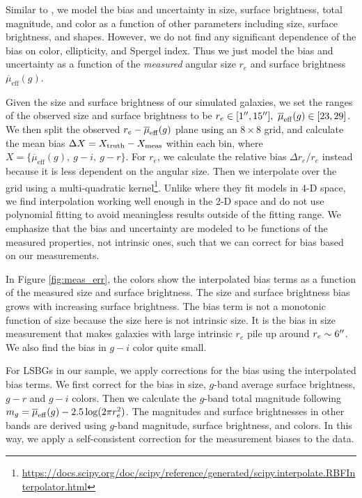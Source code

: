 \documentclass[twocolumn,astrosymb,twocolappendix]{aastex631}
\newcommand{\sbeff}{\overline{\mu}_{\mathrm{eff}}(g)}
\begin{document}
\begin{CJK*}{UTF8}{gbsn}
Similar to \citet{Zaritsky2021}, we model the bias and uncertainty in size, surface brightness, total magnitude, and color as a function of other parameters including size, surface brightness, and shapes. However, we do not find any significant dependence of the bias on color, ellipticity, and Spergel index. Thus we just model the bias and uncertainty as a function of the \textit{measured} angular size $r_e$ and surface brightness $\sbeff$.

Given the size and surface brightness of our simulated galaxies, we set the ranges of the observed size and surface brightness to be $r_e\in[1\arcsec, 15\arcsec],\ \sbeff\in[23, 29]$. We then split the observed $r_e-\overline{\mu}_{\rm eff}(g)$ plane using an $8\times 8$ grid, and calculate the mean bias $\Delta X = X_{\rm truth} - X_{\rm meas}$ within each bin, where $X=\{\sbeff,\ g-i,\ g-r\}$. For $r_e$, we calculate the relative bias $\Delta r_e / r_e$ instead because it is less dependent on the angular size. Then we interpolate over the grid using a multi-quadratic kernel\footnote{\url{https://docs.scipy.org/doc/scipy/reference/generated/scipy.interpolate.RBFInterpolator.html}}. Unlike \citet{Zaritsky2021} where they fit models in 4-D space, we find interpolation working well enough in the 2-D space and do not use polynomial fitting to avoid meaningless results outside of the fitting range. We emphasize that the bias and uncertainty are modeled to be functions of the measured properties, not intrinsic ones, such that we can correct for bias based on our measurements. 

In Figure \ref{fig:meas_err}, the colors show the interpolated bias terms as a function of the measured size and surface brightness. The size and surface brightness bias grows with increasing surface brightness. The bias term is not a monotonic function of size because the size here is not intrinsic size. It is the bias in size measurement that makes galaxies with large intrinsic $r_e$ pile up around $r_e\sim 6\mbox{$^{\prime\prime}$}$. We also find the bias in $g-i$ color quite small. 

For LSBGs in our sample, we apply corrections for the bias using the interpolated bias terms. We first correct for the bias in size, $g$-band average surface brightness, $g-r$ and $g-i$ colors. Then we calculate the $g$-band total magnitude following $m_g = \overline{\mu}_{\rm eff}(g) - 2.5\log(2\pi r_e^2)$. The magnitudes and surface brightnesses in other bands are derived using $g$-band magnitude, surface brightness, and colors. In this way, we apply a self-consistent correction for the measurement biases to the data. 


\end{CJK*}
\end{document}
